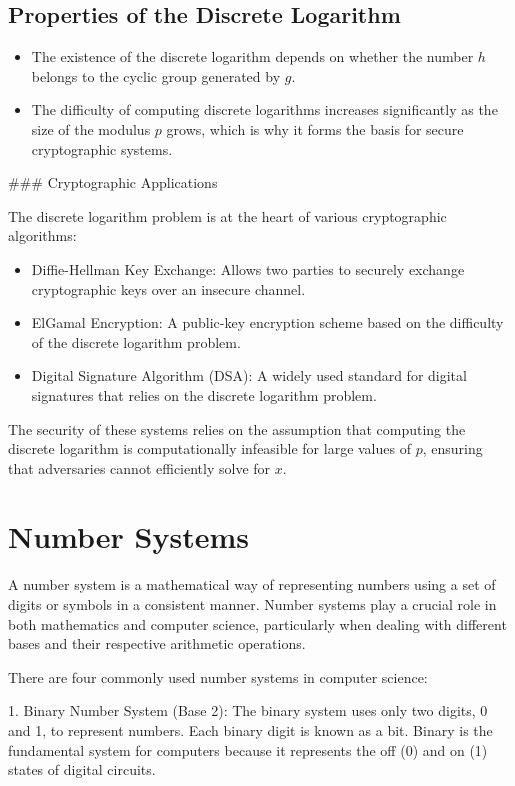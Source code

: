 \documentclass[10pt,a4paper]{article}
\begin{document}
\subsection*{Properties of the Discrete Logarithm}

\begin{itemize}
    \item The existence of the discrete logarithm depends on whether the number \(h\) belongs to the cyclic group generated by \(g\).
    \item The difficulty of computing discrete logarithms increases significantly as the size of the modulus \(p\) grows, which is why it forms the basis for secure cryptographic systems.
\end{itemize}

### Cryptographic Applications

The discrete logarithm problem is at the heart of various cryptographic algorithms:
\begin{itemize}
    \item Diffie-Hellman Key Exchange: Allows two parties to securely exchange cryptographic keys over an insecure channel.
    \item ElGamal Encryption: A public-key encryption scheme based on the difficulty of the discrete logarithm problem.
    \item Digital Signature Algorithm (DSA): A widely used standard for digital signatures that relies on the discrete logarithm problem.
\end{itemize}

The security of these systems relies on the assumption that computing the discrete logarithm is computationally infeasible for large values of \(p\), ensuring that adversaries cannot efficiently solve for \(x\).


\section*{Number Systems}

A number system is a mathematical way of representing numbers using a set of digits or symbols in a consistent manner. Number systems play a crucial role in both mathematics and computer science, particularly when dealing with different bases and their respective arithmetic operations.

There are four commonly used number systems in computer science:

1. Binary Number System (Base 2):
   The binary system uses only two digits, 0 and 1, to represent numbers. Each binary digit is known as a bit. Binary is the fundamental system for computers because it represents the off (0) and on (1) states of digital circuits.
   
\end{document}
